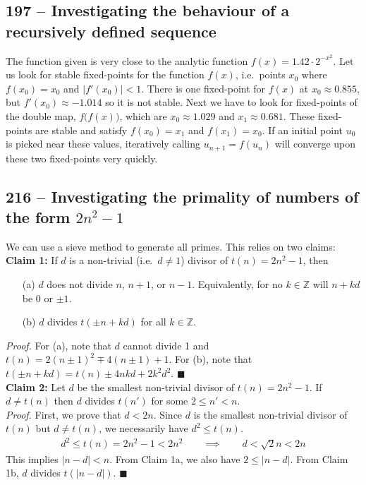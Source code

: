 \documentclass{article}
\begin{document}
\subsection*{197 -- Investigating the behaviour of a recursively defined sequence} 
The function given is very close to the analytic function $f(x) = 1.42\cdot2^{-x^2}$. 
Let us look for stable fixed-points for the function $f(x)$, i.e.~points $x_0$ where $f(x_0) = x_0$ and $|f'(x_0)| < 1$. 
There is one fixed-point for $f(x)$ at $x_0 \approx 0.855$, but $f'(x_0) \approx -1.014$ so it is not stable. 
Next we have to look for fixed-points of the double map, $f\big(f(x)\big)$, which are $x_0 \approx 1.029$ and $x_1 \approx 0.681$. 
These fixed-points are stable and satisfy $f(x_0) = x_1$ and $f(x_1) = x_0$. 
If an initial point $u_0$ is picked near these values, iteratively calling $u_{n+1} = f(u_n)$ will converge upon these two fixed-points very quickly.

\subsection*{216 -- Investigating the primality of numbers of the form $2n^2 - 1$}

We can use a sieve method to generate all primes.
This relies on two claims: \\

\textbf{Claim 1:} If $d$ is a non-trivial (i.e.~$d \neq 1$) divisor of $t(n) = 2n^2 - 1$, then
\begin{itemize}
\item[(a)] $d$ does not divide $n$, $n+1$, or $n-1$. Equivalently, for no $k \in \mathbb{Z}$ will $n + kd$ be 0 or $\pm 1$.
\item[(b)] $d$ divides $t(\pm n + k d)$ for all $k \in \mathbb{Z}$.
\end{itemize}
\emph{Proof.} For (a), note that $d$ cannot divide 1 and $t(n) = 2(n \pm 1)^2 \mp 4(n \pm 1) + 1$.
For (b), note that $t(\pm n + k d) = t(n) \pm 4 n k d + 2 k^2 d^2$. $\blacksquare$ \\

\textbf{Claim 2:} Let $d$ be the smallest non-trivial divisor of $t(n) = 2n^2 - 1$.
If $d \neq t(n)$ then $d$ divides $t(n')$ for some $2 \leq n' < n$. \\

\emph{Proof.} First, we prove that $d < 2n$. 
Since $d$ is the smallest non-trivial divisor of $t(n)$ but $d \neq t(n)$, we necessarily have $d^2 \leq t(n)$. 
\begin{align*}
	d^2 \leq t(n) = 2n^2 - 1 < 2n^2 \qquad\implies\qquad d < \sqrt{2} n < 2 n
\end{align*}
This implies $|n - d| < n$.
From Claim 1a, we also have $2 \leq |n - d|$. 
From Claim 1b, $d$ divides $t(|n-d|)$. $\blacksquare$ \\
\end{document}
